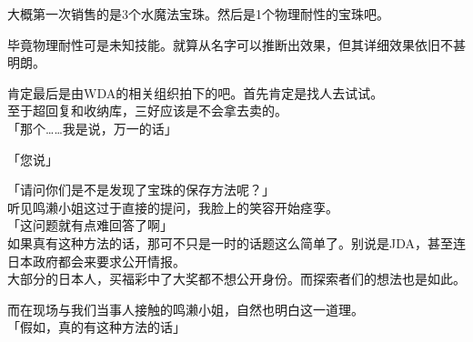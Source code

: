 大概第一次销售的是3个水魔法宝珠。然后是1个物理耐性的宝珠吧。

毕竟物理耐性可是未知技能。就算从名字可以推断出效果，但其详细效果依旧不甚明朗。

肯定最后是由WDA的相关组织拍下的吧。首先肯定是找人去试试。\\

至于超回复和收纳库，三好应该是不会拿去卖的。\\

「那个……我是说，万一的话」

「您说」

「请问你们是不是发现了宝珠的保存方法呢？」\\

听见鸣濑小姐这过于直接的提问，我脸上的笑容开始痉孪。\\

「这问题就有点难回答了啊」\\

如果真有这种方法的话，那可不只是一时的话题这么简单了。别说是JDA，甚至连日本政府都会来要求公开情报。\\

大部分的日本人，买福彩中了大奖都不想公开身份。而探索者们的想法也是如此。

而在现场与我们当事人接触的鸣濑小姐，自然也明白这一道理。\\

「假如，真的有这种方法的话」


